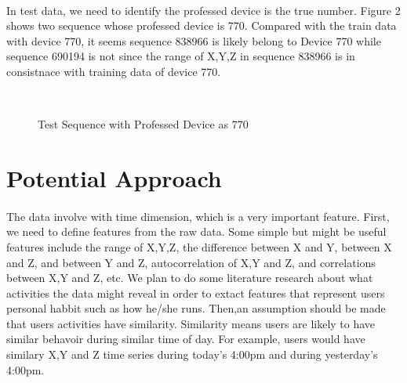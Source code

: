 \documentclass{article}
\begin{document}
	\paragraph{}In test data, we need to identify the professed device is the true number. Figure 2 shows two sequence whose professed device is 770. Compared with the train data with device 770, it seems sequence 838966 is likely belong to Device 770 while sequence 690194 is not since the range of X,Y,Z in sequence 838966 is in consistnace with training data of device 770. 
	\begin{figure}
		\centering
		\\
		\caption{Test Sequence with Professed Device as 770}
	\end{figure}
	
	

	
	\section{Potential Approach} %
	\label{sec:potential_approach}
	\paragraph{}The data involve with time dimension, which is a very important feature. First, we need to define features from the raw data. Some simple but might be useful features include the range of X,Y,Z, the difference between X and Y, between X and Z, and between Y and Z, autocorrelation of X,Y and Z, and correlations between X,Y and Z, etc. We plan to do some literature research about what activities the data might reveal in order to extact features that represent users personal habbit such as how he/she runs. Then,an assumption should be made that users activities have similarity. Similarity means users are likely to have similar behavoir during similar time of day. For example, users would have similary X,Y and Z time series during today's 4:00pm and during yesterday's 4:00pm. 
	
\end{document}
